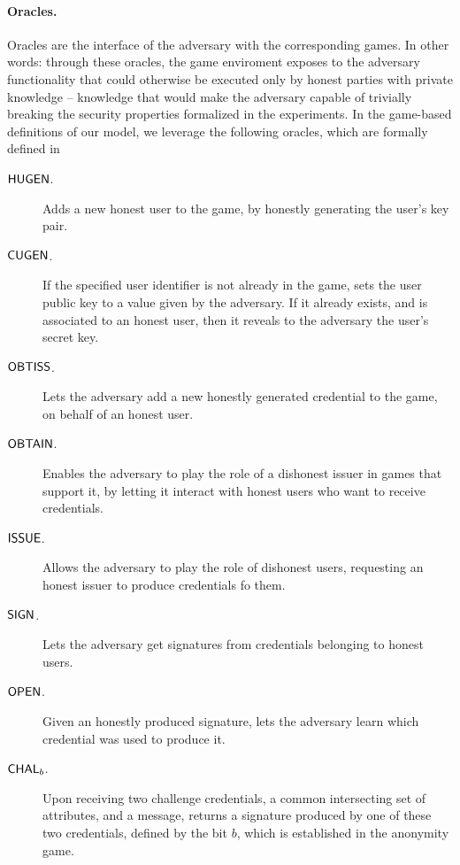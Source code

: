 \paragraph{Oracles.} %
Oracles are the interface of the adversary with the corresponding games. In
other words: through these oracles, the game enviroment exposes to the adversary
functionality that could otherwise be executed only by honest parties with
private knowledge -- knowledge that would make the adversary capable of
trivially breaking the security properties formalized in the experiments.
In the game-based definitions of our \GSAC model, we leverage the following
oracles, which are formally defined in 

\begin{description}
\item[$\mathsf{HUGEN}$.] Adds a new honest user to the game, by honestly generating
  the user's key pair.
\item[$\mathsf{CUGEN}$.] If the specified user identifier is not already in the game,
  sets the user public key to a value given by the adversary. If it already
  exists, and is associated to an honest user, then it reveals to the adversary
  the user's secret key.
\item[$\mathsf{OBTISS}$.] Lets the adversary add a new honestly generated credential to
  the game, on behalf of an honest user.
\item[$\mathsf{OBTAIN}$.] Enables the adversary to play the role of a dishonest issuer
  in games that support it, by letting it interact with honest users who want to
  receive credentials.
\item[$\mathsf{ISSUE}$.] Allows the adversary to play the role of dishonest users,
  requesting an honest issuer to produce credentials fo them.
\item[$\mathsf{SIGN}$.] Lets the adversary get signatures from credentials belonging
  to honest users.
\item[$\mathsf{OPEN}$.] Given an honestly produced signature, lets the adversary learn
  which credential was used to produce it.
\item[$\mathsf{CHAL}_b$.] Upon receiving two challenge credentials, a common intersecting
  set of attributes, and a message, returns a signature produced by one of these
  two credentials, defined by the bit $b$, which is established in the anonymity
  game.
\end{description}

